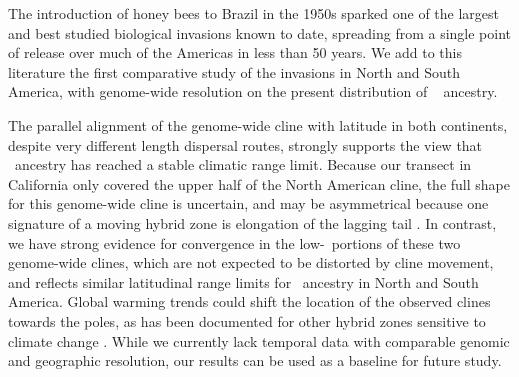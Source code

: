 The introduction of  honey bees to Brazil in the 1950s sparked one of the largest and best studied biological invasions known to date,  spreading from a single point of release over much of the Americas in less than 50 years. We add to this literature the first comparative study of the invasions in North and South America, with genome-wide resolution on the present distribution of \scutellata\  ancestry.

The parallel alignment of the genome-wide cline with latitude in both continents, despite very different length dispersal routes, strongly supports the view that \scutellata\ ancestry has reached a stable climatic range limit. Because our transect in California only covered the upper half of the North American cline, the full shape for this genome-wide cline is uncertain, and may be asymmetrical because one signature of a moving hybrid zone is elongation of the lagging tail \cite{buggs2007empirical}. In contrast, we have strong evidence for convergence in the  low-\A\ portions of these two genome-wide clines, which are not expected to be distorted by cline movement, and reflects similar latitudinal range limits for \scutellata\ ancestry in North and South America. Global warming trends could shift the location of the observed clines towards the poles, as has been documented for other hybrid zones sensitive to climate change \cite{Taylor:2015dq}. While we currently lack temporal data with comparable genomic and geographic resolution, our results can be used as a baseline for future study.

